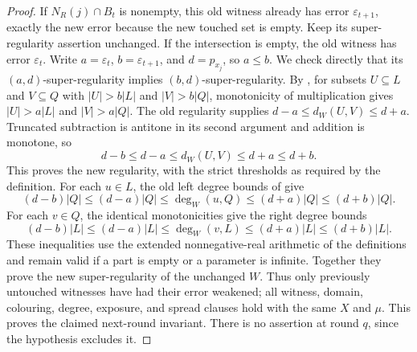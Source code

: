 \begin{proof}
If $N_R(j)\cap B_t$ is nonempty, this old witness already has error
$\varepsilon_{t+1}$, exactly the new error because the new touched set is
empty.  Keep its super-regularity assertion unchanged.  If the intersection
is empty, the old witness has error $\varepsilon_t$.  Write
$a=\varepsilon_t$, $b=\varepsilon_{t+1}$, and $d=p_{x_j}$, so $a\leq b$.
We check directly that its $(a,d)$-super-regularity implies
$(b,d)$-super-regularity.
By , for subsets $U\subseteq L$ and $V\subseteq Q$
with $|U|>b|L|$ and $|V|>b|Q|$, monotonicity of multiplication gives
$|U|>a|L|$ and $|V|>a|Q|$.  The old regularity supplies
$d-a\leq d_W(U,V)\leq d+a$.
Truncated subtraction is antitone in its second argument and addition is
monotone, so
\[
 d-b\leq d-a\leq d_W(U,V)\leq d+a\leq d+b.
\]
This proves the new regularity, with the strict thresholds as required by
the definition.  For each $u\in L$, the old left degree bounds of
 give
\[
 (d-b)|Q|\leq(d-a)|Q|\leq\deg_W(u,Q)
       \leq(d+a)|Q|\leq(d+b)|Q|.
\]
For each $v\in Q$, the identical monotonicities give the right degree bounds
\[
 (d-b)|L|\leq(d-a)|L|\leq\deg_W(v,L)
       \leq(d+a)|L|\leq(d+b)|L|.
\]
These inequalities use the extended nonnegative-real arithmetic of the
definitions and remain valid if a part is empty or a parameter is infinite.
Together they prove the new super-regularity of the unchanged $W$.
Thus only previously untouched witnesses have had their error weakened;
all witness, domain, colouring, degree, exposure, and spread clauses hold
with the same $X$ and $\mu$.  This proves the claimed next-round invariant.
There is no assertion at round $q$, since the hypothesis excludes it.
\end{proof}
